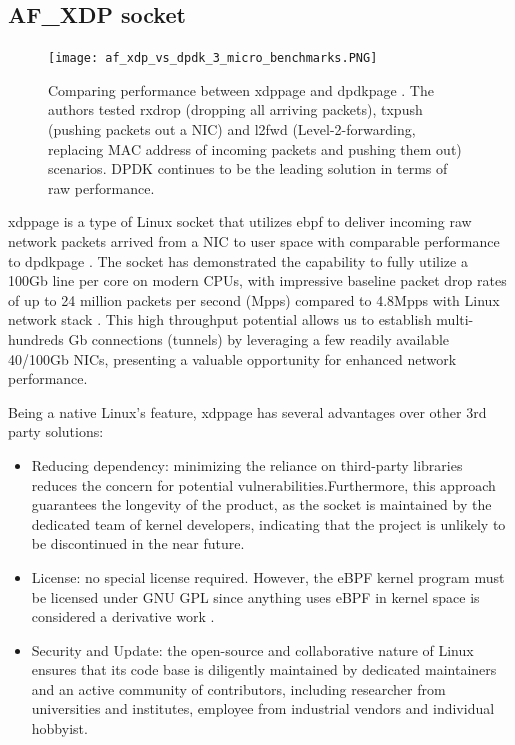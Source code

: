 \subsection{AF\_XDP socket}

\begin{figure}[H]
	\centering
	\texttt{[image: af\_xdp\_vs\_dpdk\_3\_micro\_benchmarks.PNG]}
	\caption{Comparing performance between \ac{xdppage} and \ac{dpdkpage} \cite{karlsson_path_to_dpdk_speednodate}. The authors tested  rxdrop (dropping all arriving packets), txpush (pushing packets out a NIC) and l2fwd (Level-2-forwarding, replacing MAC address of incoming packets and pushing them out) scenarios. DPDK continues to be the leading solution in terms of raw performance.}\label{fig:approach_design:af_xdp_vs_dpdk_3_micro_benchmarks}
\end{figure}

\ac{xdppage} is a type of Linux socket that utilizes \ac{ebpf} to deliver incoming raw network packets arrived from a \ac{NIC} to user space with comparable performance to \ac{dpdkpage} \cite{karlsson_path_to_dpdk_speednodate}. 
The socket has demonstrated the capability to fully utilize a 100Gb line per core on modern CPUs, with impressive baseline packet drop rates of up to 24 million packets per second (Mpps) compared to 4.8Mpps with Linux network stack \cite{hoiland_jorgensen_express_2018} \cite{intel_dpdk_perf}.
This high throughput potential allows us to establish multi-hundreds Gb connections (tunnels) by leveraging a few readily available 40/100Gb NICs, presenting a valuable opportunity for enhanced network performance.

Being a native Linux's feature, \ac{xdppage} has several advantages over other 3rd party solutions:
\begin{itemize}
	\item Reducing dependency: minimizing the reliance on third-party libraries reduces the concern for potential vulnerabilities.Furthermore, this approach guarantees the longevity of the product, as the socket is maintained by the dedicated team of kernel developers, indicating that the project is unlikely to be discontinued in the near future. 
	\item License: no special license required. However, the eBPF kernel program must be licensed under GNU \ac{GPL} since anything uses eBPF in kernel space is considered a derivative work \cite{gpl_email_discussion} \cite{linux_license_rule} \cite{lwn_clarify_bpf_license}.
	\item Security and Update: the open-source and collaborative nature of Linux ensures that its code base is diligently maintained by dedicated maintainers and an active community of contributors, including researcher from universities and institutes, employee from industrial vendors and individual hobbyist.
\end{itemize}

